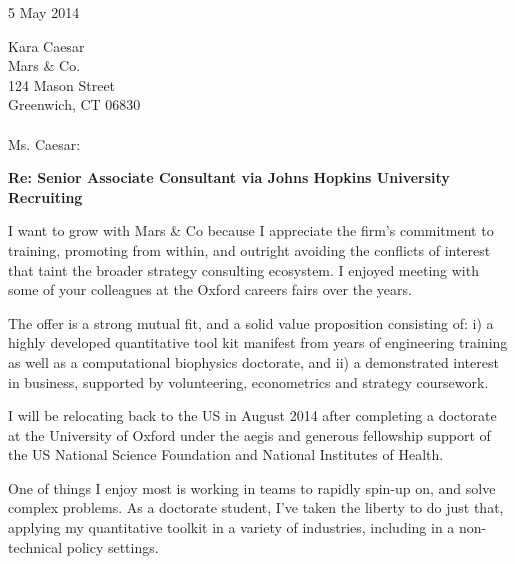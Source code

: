 \documentclass{../res}
\begin{document}
 
\begin{sloppypar}
 
%


\begin{resume} 
 
5 May 2014

Kara Caesar \\
Mars \& Co. \\
124 Mason Street \\
Greenwich, CT 06830 \\ \\
Ms. Caesar:

\textbf{Re: Senior Associate Consultant via Johns Hopkins University Recruiting}

I want to grow with Mars \& Co because I appreciate the firm's commitment to training, promoting from within, and outright avoiding the conflicts of interest that taint the broader strategy consulting ecosystem. I enjoyed meeting with some of your colleagues at the Oxford careers fairs over the years. 

The offer is a strong mutual fit, and a solid value proposition consisting of: 
i) a highly developed quantitative tool kit manifest from years of engineering training as well as a computational biophysics doctorate, and 
ii) a demonstrated interest in business, supported by volunteering, econometrics and strategy coursework. 

I will be relocating back to the US in August 2014 after completing a doctorate at the University of Oxford under the aegis and generous fellowship support of the US National Science Foundation and National Institutes of Health.

One of things I enjoy most is working in teams to rapidly spin-up on, and solve complex problems. As a doctorate student, I've taken the liberty to do just that, applying my quantitative toolkit in a variety of industries, including in a non-technical policy settings.


\end{resume}
\end{sloppypar}
\end{document}
